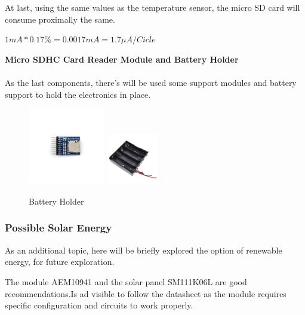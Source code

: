 At last, using the same values as the temperature sensor, the micro SD card will consume proximally the same.

\(1mA*0.17\% = 0.0017mA = 1.7 \mu A/Cicle \)

\textbf{Micro SDHC Card Reader Module and Battery Holder}\\\\
As the last components, there's will be used some support modules and battery 
support to hold the electronics in place.

\begin{figure}[H]
    \centering
    \includegraphics[width=0.3\textwidth]{images/chapter/design/components/sd_support.jpg}  %
    \label{fig:Módulo leitor de cartões micro SD}        
    \hspace{0.1cm}
    \includegraphics[width=0.2\textwidth]{images/chapter/design/components/battery-holder.jpg}  %
    \caption{Battery Holder}
    \label{fig:Battery Holder}        
\end{figure}



\subsubsection{Possible Solar Energy}
As an additional topic, here will be briefly explored the option of renewable
energy, for future exploration.

The module AEM10941 and the solar panel SM111K06L are good recommendations.Is ad
visible to follow the datasheet as the module requires specific configuration and circuits 
to work properly.


